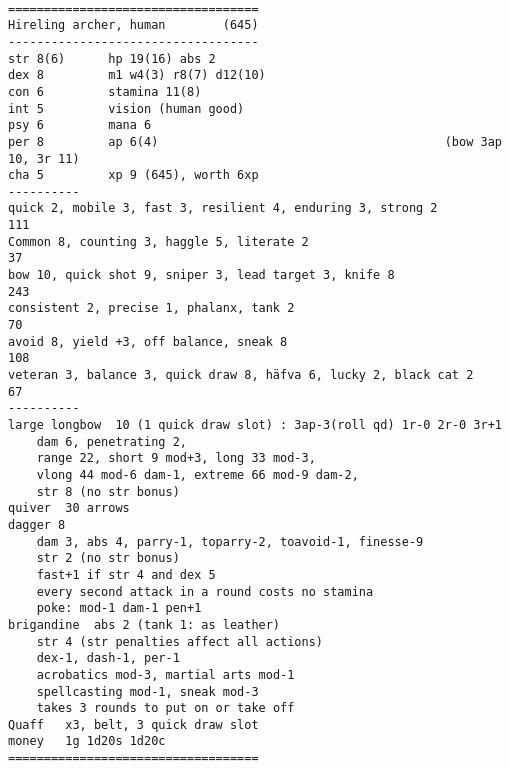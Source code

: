 \

\goodbreak \begin{samepage} \small \begin{verbatim}
===================================
Hireling archer, human        (645)
-----------------------------------
str	8(6)      hp 19(16) abs 2
dex	8         m1 w4(3) r8(7) d12(10)
con	6         stamina 11(8)
int 5         vision (human good)
psy	6         mana 6
per	8         ap 6(4)                                        (bow 3ap 10, 3r 11)
cha	5         xp 9 (645), worth 6xp
----------
quick 2, mobile 3, fast 3, resilient 4, enduring 3, strong 2              111
Common 8, counting 3, haggle 5, literate 2                                 37
bow 10, quick shot 9, sniper 3, lead target 3, knife 8                    243
consistent 2, precise 1, phalanx, tank 2                                   70
avoid 8, yield +3, off balance, sneak 8                                   108
veteran 3, balance 3, quick draw 8, häfva 6, lucky 2, black cat 2          67
----------
large longbow  10 (1 quick draw slot) : 3ap-3(roll qd) 1r-0 2r-0 3r+1
    dam 6, penetrating 2,
    range 22, short 9 mod+3, long 33 mod-3,
    vlong 44 mod-6 dam-1, extreme 66 mod-9 dam-2,
    str 8 (no str bonus)
quiver	30 arrows
dagger 8
    dam 3, abs 4, parry-1, toparry-2, toavoid-1, finesse-9
    str 2 (no str bonus)
    fast+1 if str 4 and dex 5
    every second attack in a round costs no stamina
    poke: mod-1 dam-1 pen+1
brigandine	abs 2 (tank 1: as leather)
    str 4 (str penalties affect all actions)
    dex-1, dash-1, per-1
    acrobatics mod-3, martial arts mod-1
    spellcasting mod-1, sneak mod-3
    takes 3 rounds to put on or take off
Quaff	x3, belt, 3 quick draw slot
money	1g 1d20s 1d20c
===================================
\end{verbatim} \normalsize \end{samepage}

\

